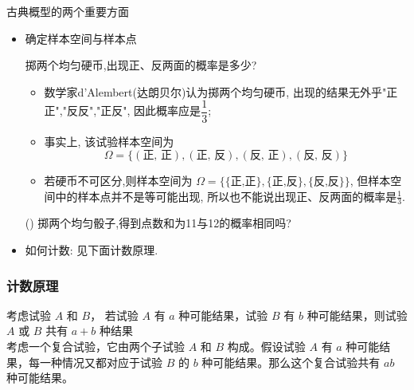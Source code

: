 \documentclass[Prob-All.tex]{subfiles}
\begin{document}
\begin{frame}{古典概型的两个重要方面}
	\begin{itemize}[<+-|alert@+>]
		\item 确定样本空间与样本点\pause
		\begin{exam} 掷两个均匀硬币,出现正、反两面的概率是多少?
		\end{exam}
		\pause
		\begin{itemize}[<+-|alert@+>]
			\item 数学家d'Alembert(达朗贝尔)认为掷两个均匀硬币, 出现的结果无外乎"正正","反反","正反", %
			因此概率应是$\dfrac{1}{3}$;
			\item 事实上, 该试验样本空间为 $$\Omega=\{(\text{正, 正}),(\text{正, 反}), (\text{反, 正}), (\text{反, 反})\}$$
			\item 若硬币不可区分,则样本空间为 $\Omega=\{\{\text{正,正}\},\{\text{正,反}\}, \{\text{反,反}\}\}$, 但样本空间中的样本点并不是等可能出现, 所以也不能说出现正、反两面的概率是$\frac{1}{3}$.
		\end{itemize}
        \begin{exam}() 掷两个均匀骰子,得到点数和为11与12的概率相同吗?
		\end{exam}

		\item 如何计数: 见下面计数原理.
	\end{itemize}


\end{frame}






	\begin{frame}
		\frametitle{计数原理}
			 考虑试验 $A$ 和 $B$， 若试验 $A$ 有 $a$ 种可能结果，试验 $B$ 有 $b$ 种可能结果，则试验 $A$ 或 $B$ 共有 $a+b$ 种结果 %
				\\
			\vspace{0.5cm}
			\pause
		   考虑一个复合试验，它由两个子试验 $A$ 和 $B$ 构成。假设试验 $A$ 有 $a$  种可能结
		果，每一种情况又都对应于试验 $B$ 的 $b$ 种可能结果。那么这个复合试验共有 $ab$ 种可能结果。%

	\end{frame}
\end{document}
